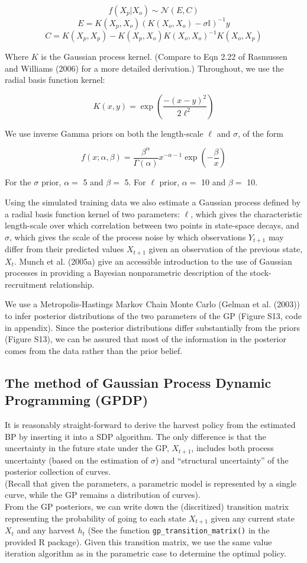 \documentclass[author-year, 12pt,review]{components/elsarticle} %
\begin{document}
\[f(X_p|X_o) \sim \mathcal{N}(E,C)\]
\[E = K(X_p, X_o) \left(K(X_o,X_o) - \sigma \mathbb{I} \right)  ^{-1} y\]
\[C = K(X_p, X_p) - K(X_p, X_o) K(X_o,X_o)^{-1} K(X_o, X_p)\]

Where $K$ is the Gaussian process kernel. (Compare to Eqn 2.22 of
Rasmussen and Williams (2006) for a more detailed derivation.)
Throughout, we use the radial basis function kernel:

\[ K(x,y) = \exp\left(\frac{-(x-y)^2}{2 \ell^2} \right)\]

We use inverse Gamma priors on both the length-scale $\ell$ and
$\sigma$, of the form

\[f(x; \alpha, \beta) = \frac{\beta^\alpha}{\Gamma(\alpha)} x^{-\alpha - 1}\exp\left(-\frac{\beta}{x}\right)\]

For the $\sigma$ prior, $\alpha = $ 5 and $\beta = $ 5. For $\ell$
prior, $\alpha = $ 10 and $\beta = $ 10.

Using the simulated training data we also estimate a Gaussian process
defined by a radial basis function kernel of two parameters: $\ell$,
which gives the characteristic length-scale over which correlation
between two points in state-space decays, and $\sigma$, which gives the
scale of the process noise by which observations $Y_{t+1}$ may differ
from their predicted values $X_{t+1}$ given an observation of the
previous state, $X_t$. Munch et al. (2005a) give an accessible
introduction to the use of Gaussian processes in providing a Bayesian
nonparametric description of the stock-recruitment relationship.

We use a Metropolis-Hastings Markov Chain Monte Carlo (Gelman et al.
(2003)) to infer posterior distributions of the two parameters of the GP
(Figure S13, code in appendix). Since the posterior distributions differ
substantially from the priors (Figure S13), we can be assured that most
of the information in the posterior comes from the data rather than the
prior belief.

\subsection{The method of Gaussian Process Dynamic Programming
(GPDP)}\label{the-method-of-gaussian-process-dynamic-programming-gpdp}

It is reasonably straight-forward to derive the harvest policy from the
estimated BP by inserting it into a SDP algorithm. The only difference
is that the uncertainty in the future state under the GP, $X_{t+1}$,
includes both process uncertainty (based on the estimation of $\sigma$)
and ``structural uncertainty'' of the posterior collection of
curves.\\(Recall that given the parameters, a parametric model is
represented by a single curve, while the GP remains a distribution of
curves).\\From the GP posteriors, we can write down the (discritized)
transition matrix representing the probability of going to each state
$X_{t+1}$ given any current state $X_t$ and any harvest $h_t$ (See the
function \texttt{gp\_transition\_matrix()} in the provided R package).
Given this transition matrix, we use the same value iteration algorithm
as in the parametric case to determine the optimal policy.
\end{document}
